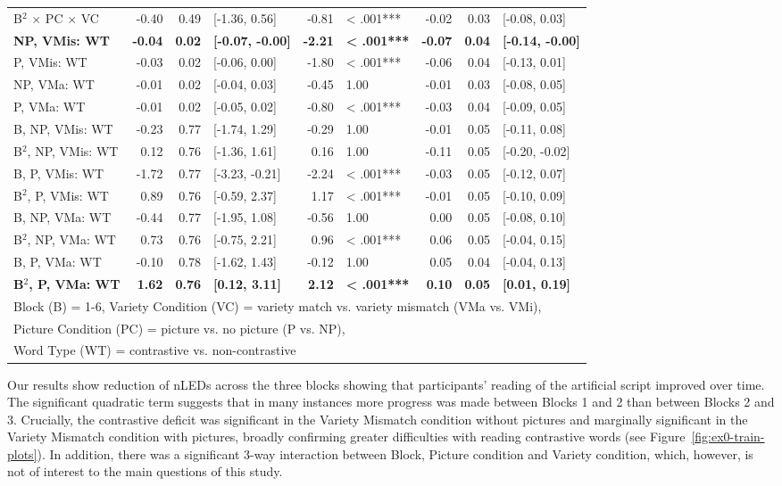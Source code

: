 \documentclass[doc,floatsintext]{apa6}
\begin{document}
\begin{table}[!h]
{\begin{tabular}{lrrlrlrrl}
B$^2$ $\times$ PC $\times$ VC & -0.40 & 0.49 & [-1.36, 0.56] & -0.81 & < .001*** & -0.02 & 0.03 & [-0.08, 0.03]\\
\textbf{NP, VMis: WT} & \textbf{-0.04} & \textbf{0.02} & \textbf{[-0.07, -0.00]} & \textbf{-2.21} & \textbf{< .001***} & \textbf{-0.07} & \textbf{0.04} & \textbf{[-0.14, -0.00]}\\
P, VMis: WT & -0.03 & 0.02 & [-0.06, 0.00] & -1.80 & < .001*** & -0.06 & 0.04 & [-0.13, 0.01]\\
NP, VMa: WT & -0.01 & 0.02 & [-0.04, 0.03] & -0.45 & 1.00 & -0.01 & 0.03 & [-0.08, 0.05]\\
P, VMa: WT & -0.01 & 0.02 & [-0.05, 0.02] & -0.80 & < .001*** & -0.03 & 0.04 & [-0.09, 0.05]\\
B, NP, VMis: WT & -0.23 & 0.77 & [-1.74, 1.29] & -0.29 & 1.00 & -0.01 & 0.05 & [-0.11, 0.08]\\
B$^2$, NP, VMis: WT & 0.12 & 0.76 & [-1.36, 1.61] & 0.16 & 1.00 & -0.11 & 0.05 & [-0.20, -0.02]\\
B, P, VMis: WT & -1.72 & 0.77 & [-3.23, -0.21] & -2.24 & < .001*** & -0.03 & 0.05 & [-0.12, 0.07]\\
B$^2$, P, VMis: WT & 0.89 & 0.76 & [-0.59, 2.37] & 1.17 & < .001*** & -0.01 & 0.05 & [-0.10, 0.09]\\
B, NP, VMa: WT & -0.44 & 0.77 & [-1.95, 1.08] & -0.56 & 1.00 & 0.00 & 0.05 & [-0.08, 0.10]\\
B$^2$, NP, VMa: WT & 0.73 & 0.76 & [-0.75, 2.21] & 0.96 & < .001*** & 0.06 & 0.05 & [-0.04, 0.15]\\
B, P, VMa: WT & -0.10 & 0.78 & [-1.62, 1.43] & -0.12 & 1.00 & 0.05 & 0.04 & [-0.04, 0.13]\\
\textbf{B$^2$, P, VMa: WT} & \textbf{1.62} & \textbf{0.76} & \textbf{[0.12, 3.11]} & \textbf{2.12} & \textbf{< .001***} & \textbf{0.10} & \textbf{0.05} & \textbf{[0.01, 0.19]}\\
\bottomrule
\multicolumn{9}{l}{Block (B) = 1-6, Variety Condition (VC) = variety match vs. variety mismatch (VMa vs. VMi),}\\
\multicolumn{9}{l}{Picture Condition (PC) = picture vs. no picture (P vs. NP),}\\
\multicolumn{9}{l}{Word Type (WT) = contrastive vs. non-contrastive}\\
\end{tabular}}
\end{table}

Our results show reduction of nLEDs across the three blocks showing that
participants' reading of the artificial script improved over time. The
significant quadratic term suggests that in many instances more progress
was made between Blocks 1 and 2 than between Blocks 2 and 3. Crucially,
the contrastive deficit was significant in the Variety Mismatch
condition without pictures and marginally significant in the Variety
Mismatch condition with pictures, broadly confirming greater
difficulties with reading contrastive words (see
Figure~\ref{fig:ex0-train-plots}). In addition, there was a significant
3-way interaction between Block, Picture condition and Variety
condition, which, however, is not of interest to the main questions of
this study.
\end{document}
